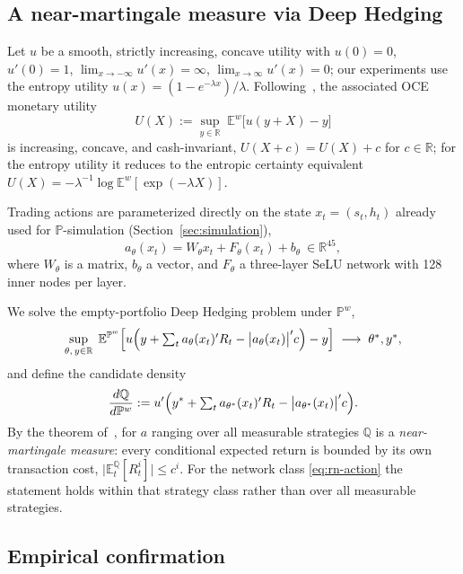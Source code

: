\documentclass[11pt,a4paper]{article}
\newcommand{\R}{\mathbb{R}}
\newcommand{\E}{\mathbb{E}}
\newcommand{\Q}{\mathbb{Q}}
\renewcommand{\P}{\mathbb{P}}
\renewcommand{\Q}{\mathbb{Q}}
\begin{document}
\subsection{A near-martingale measure via Deep Hedging}

Let $u$ be a smooth, strictly increasing, concave utility with
$u(0)=0$, $u'(0)=1$, $\lim_{x\to-\infty}u'(x)=\infty$, $\lim_{x\to\infty}u'(x)=0$;
our experiments use the entropy utility $u(x)=(1-e^{-\lambda x})/\lambda$.
Following~\cite{OCE}, the associated OCE monetary utility
\begin{equation}
  U(X):=\sup_{y\in\R}\;\E^{w}\bigl[u(y+X)-y\bigr]
  \label{eq:rn-oce}
\end{equation}
is increasing, concave, and cash-invariant,
$U(X+c)=U(X)+c$ for $c\in\R$; for the entropy utility it reduces to the
entropic certainty equivalent
$U(X)=-\lambda^{-1}\log\E^w[\exp(-\lambda X)]$.

Trading actions are parameterized directly on the state $x_t=(s_t,h_t)$
already used for $\P$-simulation (Section~\ref{sec:simulation}),
\begin{equation}
  a_\theta(x_t)=W_\theta x_t+F_\theta(x_t)+b_\theta\ \in\R^{45},
  \label{eq:rn-action}
\end{equation}
where $W_\theta$ is a matrix, $b_\theta$ a vector, and $F_\theta$ a
three-layer SeLU network with 128 inner nodes per layer.

We solve the empty-portfolio Deep Hedging problem under $\P^w$,
\begin{equation}
  \sup_{\theta,\,y\in\R}\;
  \E^{\P^w}\Bigl[
    u\Bigl(y+\textstyle\sum_t a_\theta(x_t)'R_t-\bigl|a_\theta(x_t)\bigr|'c\Bigr)-y
  \Bigr]
  \;\longrightarrow\;\theta^*,y^*,
  \label{eq:rn-deephedge}
\end{equation}
and define the candidate density
\begin{equation}
  \frac{d\Q}{d\P^w}:=
  u'\Bigl(y^*+\textstyle\sum_t a_{\theta^*}(x_t)'R_t-\bigl|a_{\theta^*}(x_t)\bigr|'c\Bigr).
  \label{eq:rn-density}
\end{equation}
By the theorem of~\cite{removelong}, for $a$ ranging over all measurable
strategies $\Q$ is a \emph{near-martingale measure}: every conditional
expected return is bounded by its own transaction cost,
$\bigl|\E_t^\Q[R_t^i]\bigr|\leq c^i$.  For the network class
\eqref{eq:rn-action} the statement holds within that strategy class rather
than over all measurable strategies.

\subsection{Empirical confirmation}
\end{document}
